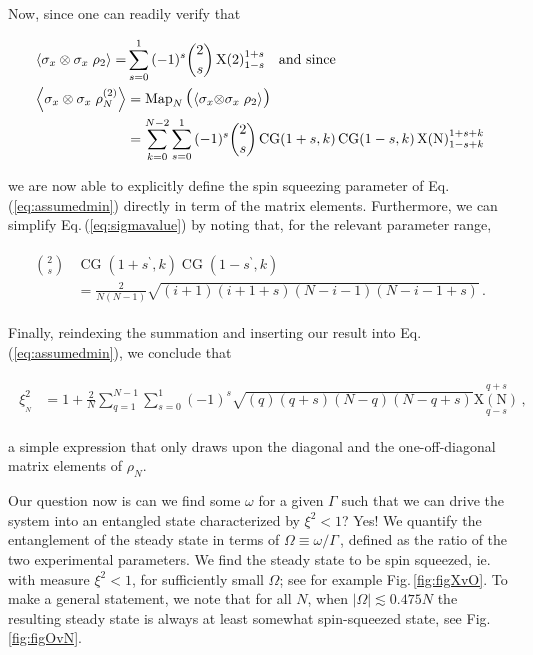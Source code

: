 \documentclass[
  12pt          %
  ,letterpaper  %
  ,center       %
  ,noupper      %
  ,english,fleqn]{uconnthesis}
\newcommand{\LeftEqns}[1]{\begin{fleqn}[\leftmargini minus \leftmargini]\begin{align}#1\end{align}\end{fleqn}}
\newcommand{\LeftEqn}[1]{\LeftEqns{\begin{split}#1\end{split}}}
\newcommand{\ceq}[1]{Eq.\,(\ref{#1})}
\newcommand{\fig}[1]{Fig.\,\ref{#1}}
\newcommand{\bp}{^\backprime}
\newcommand{\nmap}[1]{{\operatorname{Map}_N{\mathlarger{\mathlarger{\left(\mathsmaller{\mathsmaller{ #1}}\right)}}}}}
\begin{document}
Now, since one can readily verify that
\LeftEqns{
\Braket{\sigma_x \otimes \sigma_x \;\rho_2}=&\sum\limits_{s=0}^{1}{(-1)^s\binom{2}{s}\operatorname{X(2)}\limits_{1-s}^{1+s}}\quad\text{and since}\\\label{eq:sigmavalue}
\Braket{\sigma_x \otimes \sigma_x \;\rho_N^{(2)}}&=\nmap{\Braket{\sigma_x \otimes \sigma_x \;\rho_2}}\\\nonumber
&=\sum\limits_{k=0}^{N-2}{\sum\limits_{s=0}^{1}{(-1)^s\binom{2}{s}\operatorname{CG}(1+s,k)\operatorname{CG}(1-s,k)\operatorname{X(N)}\limits_{1-s+k}^{1+s+k}}}
}
we are now able to explicitly define the spin squeezing parameter of \ceq{eq:assumedmin} directly in term of the matrix elements. Furthermore, we can simplify \ceq{eq:sigmavalue} by noting that, for the relevant parameter range,
\LeftEqn{
\binom{2}{s}&\operatorname{CG}(1+s\bp,k)\operatorname{CG}(1-s\bp,k)\\
&=\frac{2}{N(N-1)} \sqrt{(i+1)(i+1+s)(N-i-1)(N-i-1+s)}\,.
}

Finally, reindexing the summation and inserting our result into \ceq{eq:assumedmin},  we conclude that
\LeftEqn{\label{eq:altchi}
\xi^2_{_N}&=1+\frac{2}{N}\sum\limits_{q=1}^{N-1}{\sum\limits_{s=0}^{1}{(-1)^s \sqrt{(q)(q+s)(N-q)(N-q+s)}\operatorname{X(N)}\limits_{q-s}^{q+s}}}\,,
}
a simple expression that only draws upon the diagonal and the one-off-diagonal matrix elements of $\rho_N$.


Our question now is can we find some $\omega$ for a given $\Gamma$ such that we can drive the system into an entangled state characterized by $\xi^2<1$? Yes! We quantify the entanglement of the steady state in terms of $\Omega\equiv \omega/\Gamma\,$, defined as the ratio of the two experimental parameters. We find the steady state to be spin squeezed, ie. with measure $\xi^2<1$, for sufficiently small $\Omega$; see for example \fig{fig:figXvO}. To make a general statement, we note that for all $N$, when $ |\Omega| \lesssim 0.475 N$ the resulting steady state is always at least somewhat spin-squeezed state, see \fig{fig:figOvN}.
\end{document}
